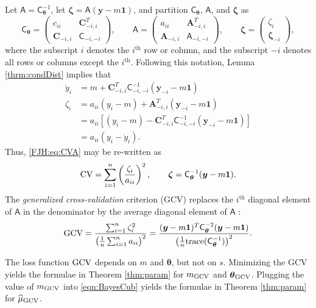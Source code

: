 \documentclass{svjour3}                     %
\newcommand{\bm}[1]{\boldsymbol{#1}}
\newcommand{\trace}[1]{\textup{trace}{#1}}
\newcommand{\vtheta}{{\bm{\theta}}}
\newcommand{\vzeta}{{\bm{\zeta}}}
\newcommand{\vA}{\bm{A}}
\newcommand{\vC}{\bm{C}}
\newcommand{\vy}{\bm{y}}
\newcommand{\vone}{\bm{1}}
\newcommand{\mA}{\mathsf{A}}
\newcommand{\mC}{\mathsf{C}}
\newcommand{\GCV}{\textup{GCV}}
\begin{document}
Let $\mA = \mC^{-1}_\vtheta$, let $\vzeta = \mA (\vy - m \vone)$, and partition $\mC_\vtheta$, $\mA$, and $\vzeta$ as
\begin{equation*}
\mC_\vtheta = \begin{pmatrix} c_{ii}  & \vC_{-i,i}^T \\  \vC_{-i,i} & \mC_{-i,-i}\end{pmatrix}, \qquad
\mA = \begin{pmatrix} a_{ii}  & \vA_{-i,i}^T \\  \vA_{-i,i} & \mA_{-i,-i}\end{pmatrix}, \qquad \vzeta = \begin{pmatrix} \zeta_i   \\  \vzeta_{-i} \end{pmatrix},
\end{equation*}
where the subscript $i$ denotes the $i^{\text{th}}$ row or column, and the subscript $-i$ denotes all rows or columns except the $i^{\text{th}}$. Following this notation, Lemma \ref{thrm:condDist} implies that 
\begin{align*}
\mathring{y}_i & = m + \vC^T_{-i,i} \mC_{-i,-i}^{-1} (\vy_{-i} -m \vone)  \\
\zeta_i  & = a_{ii}(y_i - m) + \vA_{-i,i}^T(\vy_{-i} - m \vone) \\
& = a_{ii}[(y_i - m) - \vC^T_{-i,i} \mC_{-i,-i}^{-1} (\vy_{-i} -m \vone)] \\
& = a_{ii}(y_i - \mathring{y}_i).
\end{align*}
Thus, \eqref{FJH:eq:CVA} may be re-written as 
\begin{align*} %
\textup{CV} = \sum_{i=1}^n \left(\frac{\zeta_i}{a_{ii}} \right)^2, \qquad \vzeta = \mC^{-1}_\vtheta(\vy - m \vone).
\end{align*}
The \emph{generalized cross-validation} criterion (GCV) replaces the $i^{\text{th}}$ diagonal element of $\mA$ in the denominator by the average diagonal element of $\mA$ \citep{CraWah79a,GolHeaWah79a,Wah90}:
\begin{equation*} 
\textup{GCV}
= \frac{\sum_{i=1}^n\zeta_i^2}{\left(\frac 1n \sum_{i=1}^n a_{ii} \right)^2} 
= \frac{(\vy - m\vone)^T \mC^{-2}_\vtheta (\vy - m \vone)}{\left(\frac 1n \trace(\mC_\vtheta^{-1}) \right)^2}.
\end{equation*}

The loss function $\textup{GCV}$ depends on $m$ and $\vtheta$, but not on $s$.  Minimizing the GCV  yields the formulae in Theorem \ref{thm:param} for $m_{\textup{GCV}}$ and $\vtheta_{\textup{GCV}}$.  
Plugging the value of $m_\GCV$ into \eqref{eqn:BayesCub} yields the formulae in Theorem \ref{thm:param} for $\widehat{\mu}_{\textup{GCV}}$.
\end{document}
